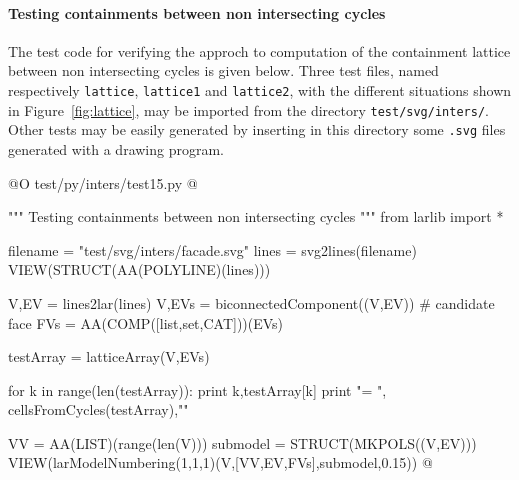 \documentclass[11pt,oneside]{article}	%
\begin{document}
\paragraph{Testing containments between non intersecting cycles}

The test code for verifying the approch to computation of the containment lattice between non intersecting cycles is given below. Three test files, named respectively \texttt{lattice}, \texttt{lattice1} and \texttt{lattice2},  with the different situations shown in Figure~\ref{fig:lattice}, may be imported from the directory \texttt{test/svg/inters/}. Other tests may be easily generated by inserting in this directory some \texttt{.svg} files generated with a drawing program. 

@O test/py/inters/test15.py
@{""" Testing containments between non intersecting cycles """
from larlib import *

filename = "test/svg/inters/facade.svg"
lines = svg2lines(filename)
VIEW(STRUCT(AA(POLYLINE)(lines)))

V,EV = lines2lar(lines)
V,EVs = biconnectedComponent((V,EV))
# candidate face
FVs = AA(COMP([list,set,CAT]))(EVs)

testArray = latticeArray(V,EVs)

for k in range(len(testArray)):
	print k,testArray[k]
print "\ncells = ", cellsFromCycles(testArray),"\n"

VV = AA(LIST)(range(len(V)))
submodel = STRUCT(MKPOLS((V,EV)))
VIEW(larModelNumbering(1,1,1)(V,[VV,EV,FVs],submodel,0.15)) 
@}
\end{document}
